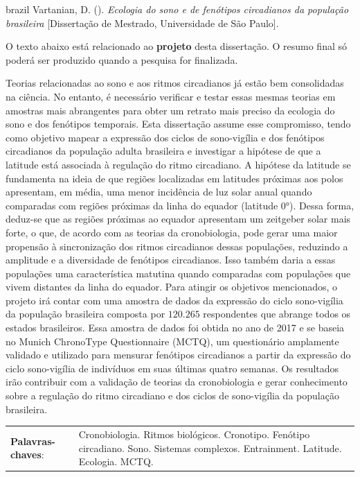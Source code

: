 \documentclass[
12pt,
openright,
oneside,
a4paper,
chapter=TITLE,
section=TITLE,
french,
spanish,
brazil,
english
]{abntex2}\usepackage{array}
\newcommand{\resumoestrangeironame}{Resumo}
\renewcommand{\resumoname}{Abstract}
\renewcommand{\resumoestrangeironame}{Resumo}
\renewcommand{\resumoname}{Resumo}
\renewcommand{\resumoestrangeironame}{Abstract}
\renewcommand{\resumoname}{Resumen}
\renewcommand{\resumoestrangeironame}{Resumo}
\renewcommand{\resumoname}{Résumé}
\renewcommand{\resumoestrangeironame}{Resumo}
\newenvironment{resumoenv}[1][\resumoname]{
  \pretextualchapter{#1}
  \begingroup
  \setlength{\parindent}{0cm}
  \setlength{\parskip}{\smallskipamount} %
  \AtBeginEnvironment{tabular}{\normalsize}
  \renewcommand{\arraystretch}{1}
  \setlength{\aboverulesep}{0ex}
  \setlength{\belowrulesep}{0ex}
  \setlength{\arrayrulewidth}{0pt}
  \setlength{\tabcolsep}{0cm}
  \vspace{-\smallskipamount} %
  \begin{SingleSpace}
}{
  \end{SingleSpace}
  \cleardoublepage
  \endgroup
}
\begin{document}

\begin{resumoenv}[\resumoestrangeironame]
\begin{otherlanguage*}{brazil}
Vartanian, D. ({\imprimirdata}). \textit{Ecologia do sono e de fenótipos circadianos da população brasileira} [Dissertação de Mestrado, Universidade de São Paulo].


O texto abaixo está relacionado ao \textbf{projeto} desta dissertação. O
resumo final só poderá ser produzido quando a pesquisa for finalizada.

Teorias relacionadas ao sono e aos ritmos circadianos já estão bem
consolidadas na ciência. No entanto, é necessário verificar e testar
essas mesmas teorias em amostras mais abrangentes para obter um retrato
mais preciso da ecologia do sono e dos fenótipos temporais. Esta
dissertação assume esse compromisso, tendo como objetivo mapear a
expressão dos ciclos de sono-vigília e dos fenótipos circadianos da
população adulta brasileira e investigar a hipótese de que a latitude
está associada à regulação do ritmo circadiano. A hipótese da latitude
se fundamenta na ideia de que regiões localizadas em latitudes próximas
aos polos apresentam, em média, uma menor incidência de luz solar anual
quando comparadas com regiões próximas da linha do equador (latitude
0°). Dessa forma, deduz-se que as regiões próximas ao equador apresentam
um zeitgeber solar mais forte, o que, de acordo com as teorias da
cronobiologia, pode gerar uma maior propensão à sincronização dos ritmos
circadianos dessas populações, reduzindo a amplitude e a diversidade de
fenótipos circadianos. Isso também daria a essas populações uma
característica matutina quando comparadas com populações que vivem
distantes da linha do equador. Para atingir os objetivos mencionados, o
projeto irá contar com uma amostra de dados da expressão do ciclo
sono-vigília da população brasileira composta por \(120.265\)
respondentes que abrange todos os estados brasileiros. Essa amostra de
dados foi obtida no ano de 2017 e se baseia no Munich ChronoType
Questionnaire (MCTQ), um questionário amplamente validado e utilizado
para mensurar fenótipos circadianos a partir da expressão do ciclo
sono-vigília de indivíduos em suas últimas quatro semanas. Os resultados
irão contribuir com a validação de teorias da cronobiologia e gerar
conhecimento sobre a regulação do ritmo circadiano e dos ciclos de
sono-vigília da população brasileira.


\begin{tabular}{p{3.6cm} p{12.3cm}}
  \textbf{Palavras-chaves}: &  Cronobiologia. Ritmos biológicos. Cronotipo. Fenótipo circadiano. Sono. Sistemas complexos. Entrainment. Latitude. Ecologia. MCTQ.
\end{tabular}
\end{otherlanguage*}
\end{resumoenv}
\end{document}
